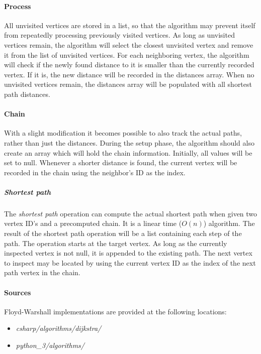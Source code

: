 \documentclass{article}
\begin{document}
{\paragraph{Process}
All unvisited vertices are stored in a list, so that the algorithm may prevent itself from repeatedly
processing previously visited vertices. As long as unvisited vertices remain, the algorithm will select the closest
unvisited vertex and remove it from the list of unvisited vertices. For each neighboring vertex, the algorithm will
check if the newly found distance to it is smaller than the currently recorded vertex. If it is, the new distance
will be recorded in the distances array. When no unvisited vertices remain, the distances array will be populated
with all shortest path distances.

\paragraph{Chain}
With a slight modification it becomes possible to also track the actual paths, rather than just the distances.
During the setup phase, the algorithm should also create an array which will hold the chain information.
Initially, all values will be set to null. Whenever a shorter distance is found, the current vertex will be
recorded in the chain using the neighbor's ID as the index.

\subparagraph{Shortest path}
The {\em shortest path} operation can compute the actual shortest path when given two vertex ID's and a precomputed
chain. It is a linear time (\(O(n)\)) algorithm. The result of the shortest path operation will be a list containing
each step of the path. The operation starts at the target vertex. As long as the currently inspected vertex is not
null, it is appended to the existing path. The next vertex to inspect may be located by using the current vertex ID
as the index of the next path vertex in the chain.

\begin{samepage}
  \paragraph{Sources}
  Floyd-Warshall implementations are provided at the following locations:
  \begin{itemize}
  \item{{\em csharp/algorithms/dijkstra/}}
  \item{{\em python\_3/algorithms/}}
  \end{itemize}
\end{samepage}


}
\end{document}
